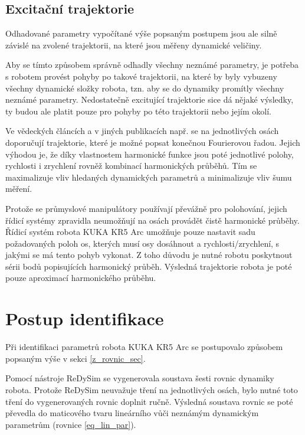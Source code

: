 \subsection{Excitační trajektorie}

Odhadované parametry vypočítané výše popsaným postupem jsou ale silně závislé na zvolené trajektorii, na které jsou měřeny dynamické veličiny. 

Aby se tímto způsobem správně odhadly všechny neznámé parametry, je potřeba s robotem provést pohyby po takové trajektorii, na které by byly vybuzeny všechny dynamické složky robota, tzn. aby se do dynamiky promítly všechny neznámé parametry. Nedostatečně excitující trajektorie sice dá nějaké výsledky, ty budou ale platit pouze pro pohyby po této trajektorii nebo jejím okolí.

Ve vědeckých článcích a v jiných publikacích např. \cite{clos_dyn_par}\cite{dyn_mod_ind}\cite{dyn_ind_mits} se na jednotlivých osách doporučují trajektorie, které je možné popsat konečnou Fourierovou řadou. Jejich výhodou je, že díky vlastnostem harmonické funkce jsou poté jednotlivé polohy, rychlosti i zrychlení rovněž kombinací harmonických průběhů. Tím se maximalizuje vliv hledaných dynamických parametrů a minimalizuje vliv šumu měření. 

Protože se průmyslové manipulátory používají převážně pro polohování, jejich řídicí systémy zpravidla neumožňují na osách provádět čistě harmonické průběhy. Řídicí systém robota KUKA KR5 Arc umožňuje pouze nastavit sadu požadovaných poloh os, kterých musí osy dosáhnout a rychlosti/zrychlení, s jakými se má tento pohyb vykonat. Z toho důvodu je nutné robotu poskytnout sérii bodů popisujících harmonický průběh. Výsledná trajektorie robota je poté pouze aproximací harmonického průběhu.  


\section{Postup identifikace}

Při identifikaci parametrů robota KUKA KR5 Arc se postupovalo způsobem popsaným výše v sekci \ref{z_rovnic_sec}. 

Pomocí nástroje ReDySim se vygenerovala soustava šesti rovnic dynamiky robota. Protože ReDySim neuvažuje tření na jednotlivých osách, bylo nutné toto tření do vygenerovaných rovnic doplnit ručně. Výsledná soustava rovnic se poté převedla do maticového tvaru lineárního vůči neznámým dynamickým parametrům (rovnice \ref{eq_lin_par}). 

